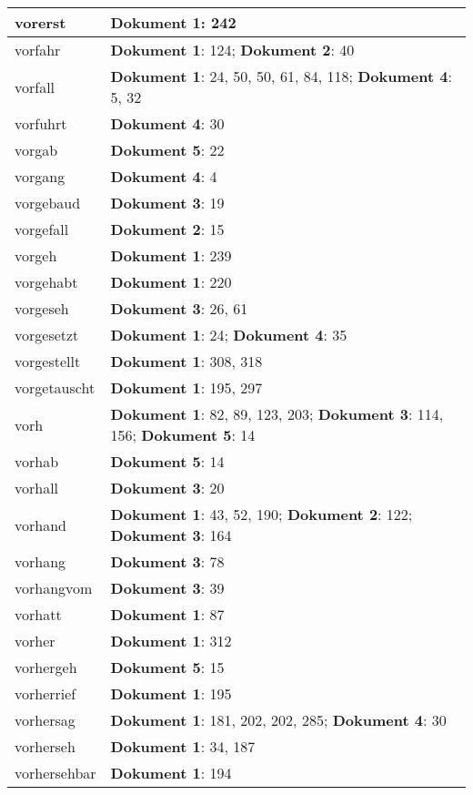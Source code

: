 \documentclass[a5paper]{article}
\begin{document}
\begin{longtable}[l]{|l|p{3in}|}
\hline
vorerst & \textbf{Dokument 1}: 242 \\
\hline
vorfahr & \textbf{Dokument 1}: 124; \textbf{Dokument 2}: 40 \\
\hline
vorfall & \textbf{Dokument 1}: 24, 50, 50, 61, 84, 118; \textbf{Dokument 4}: 5, 32 \\
\hline
vorfuhrt & \textbf{Dokument 4}: 30 \\
\hline
vorgab & \textbf{Dokument 5}: 22 \\
\hline
vorgang & \textbf{Dokument 4}: 4 \\
\hline
vorgebaud & \textbf{Dokument 3}: 19 \\
\hline
vorgefall & \textbf{Dokument 2}: 15 \\
\hline
vorgeh & \textbf{Dokument 1}: 239 \\
\hline
vorgehabt & \textbf{Dokument 1}: 220 \\
\hline
vorgeseh & \textbf{Dokument 3}: 26, 61 \\
\hline
vorgesetzt & \textbf{Dokument 1}: 24; \textbf{Dokument 4}: 35 \\
\hline
vorgestellt & \textbf{Dokument 1}: 308, 318 \\
\hline
vorgetauscht & \textbf{Dokument 1}: 195, 297 \\
\hline
vorh & \textbf{Dokument 1}: 82, 89, 123, 203; \textbf{Dokument 3}: 114, 156; \textbf{Dokument 5}: 14 \\
\hline
vorhab & \textbf{Dokument 5}: 14 \\
\hline
vorhall & \textbf{Dokument 3}: 20 \\
\hline
vorhand & \textbf{Dokument 1}: 43, 52, 190; \textbf{Dokument 2}: 122; \textbf{Dokument 3}: 164 \\
\hline
vorhang & \textbf{Dokument 3}: 78 \\
\hline
vorhangvom & \textbf{Dokument 3}: 39 \\
\hline
vorhatt & \textbf{Dokument 1}: 87 \\
\hline
vorher & \textbf{Dokument 1}: 312 \\
\hline
vorhergeh & \textbf{Dokument 5}: 15 \\
\hline
vorherrief & \textbf{Dokument 1}: 195 \\
\hline
vorhersag & \textbf{Dokument 1}: 181, 202, 202, 285; \textbf{Dokument 4}: 30 \\
\hline
vorherseh & \textbf{Dokument 1}: 34, 187 \\
\hline
vorhersehbar & \textbf{Dokument 1}: 194 \\
\hline

\end{longtable}
\end{document}
